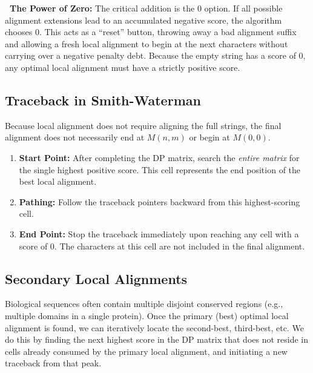\documentclass[11pt, a4paper]{article}
\newcommand{\sta}{\textbf{\sffamily [CRITICAL / EXAM]\ }}
\begin{document}
\sta \textbf{The Power of Zero:} The critical addition is the $0$ option. If all possible alignment extensions lead to an accumulated negative score, the algorithm chooses $0$. This acts as a ``reset'' button, throwing away a bad alignment suffix and allowing a fresh local alignment to begin at the next characters without carrying over a negative penalty debt. Because the empty string has a score of $0$, any optimal local alignment must have a strictly positive score.

\subsection{Traceback in Smith-Waterman}
Because local alignment does not require aligning the full strings, the final alignment does not necessarily end at $M(n,m)$ or begin at $M(0,0)$.
\begin{enumerate}
    \item \textbf{Start Point:} After completing the DP matrix, search the \textit{entire matrix} for the single highest positive score. This cell represents the end position of the best local alignment.
    \item \textbf{Pathing:} Follow the traceback pointers backward from this highest-scoring cell.
    \item \textbf{End Point:} Stop the traceback immediately upon reaching any cell with a score of $0$. The characters at this cell are not included in the final alignment.
\end{enumerate}

\subsection{Secondary Local Alignments}
Biological sequences often contain multiple disjoint conserved regions (e.g., multiple domains in a single protein). Once the primary (best) optimal local alignment is found, we can iteratively locate the second-best, third-best, etc. We do this by finding the next highest score in the DP matrix that does not reside in cells already consumed by the primary local alignment, and initiating a new traceback from that peak.
\end{document}
